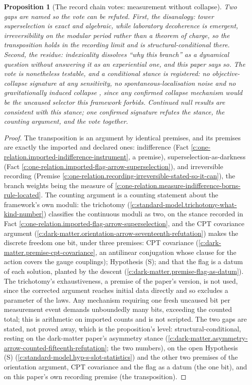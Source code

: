 \documentclass[11pt]{article}
\newtheorem{proposition}[theorem]{Proposition}
\theoremstyle{definition}
\theoremstyle{plain}
\begin{document}
\begin{proposition}[The record chain votes: measurement without collapse]
Two gaps are named so the vote can be refuted. First, the \emph{disanalogy}: tower superselection is exact and algebraic, while laboratory decoherence is emergent, irreversibility on the modular period rather than a theorem of charge, so the transposition holds in the recording limit and is structural-conditional there. Second, the \emph{residue}: indexicality dissolves ``why this branch'' as a dynamical question without answering it as an experiential one, and this paper says so. The vote is nonetheless testable, and a conditional stance is registered: no objective-collapse signature at any sensitivity, no spontaneous-localisation noise and no gravitationally induced collapse \cite{GRW1986, Penrose1996}, since any confirmed collapse mechanism would be the uncaused selector this framework forbids. Continued null results are consistent with this stance; one confirmed signature refutes the stance, the counting argument, and the vote together.
\end{proposition}
\begin{proof}
The transposition is an argument by identical premises, and its premises are exactly the imported and declared ones: indifference (Fact \ref{c:one-relation.imported-indifference-instrument}, a premise), superselection-as-darkness (Fact \ref{c:one-relation.imported-flag-arrow-superselection}), and irreversible recording (Premise \ref{c:one-relation.recording-irreversible-stated-so-it-can}), the branch weights being the measure of \ref{c:one-relation.measure-indifference-borns-rule-located}. The counting argument is a counting statement about the framework's own moduli: the trichotomy (\ref{c:standard-model.trichotomy-what-kind-number}) classifies the continuous moduli as two, on the stance recorded in Fact \ref{c:one-relation.imported-flag-arrow-superselection}, and the CPT covariance argument (\ref{c:dark-matter.orientation-arrow-seventeenth-refutation}) makes the discrete freedom one bit, under three premises: CPT covariance (\ref{c:dark-matter.premise-cpt-covariance}, an antilinear conjugation whose clause for the action covers the gauge couplings); Hypothesis (S); and that the flag is a datum of each solution, planted by the descent (\ref{c:dark-matter.premise-flag-as-datum}). The trichotomy's exhaustiveness, a premise of the paper's version, is not used, since the corrected argument reaches initial data directly and so excludes a parameter of the laws. Any mechanism requiring one fresh uncaused bit per measurement event demands unboundedly many bits, exceeding the counted total; this is arithmetic on imported counts and is not scripted. The two gaps are stated, not proved away, which is the proposition's level: structural-conditional, resting on the dark-matter paper's asymmetry stance (\ref{c:dark-matter.asymmetry-arrow-counted-fifteenth-refutation}; the two numbers), on the open Hypothesis (S) (\ref{c:standard-model.hyp-s-slot-statistics}) and the other two premises of the orientation argument, CPT covariance and the flag as a datum (the one bit), and on this paper's own recording premise (the transposition).

\end{proof}
\end{document}
